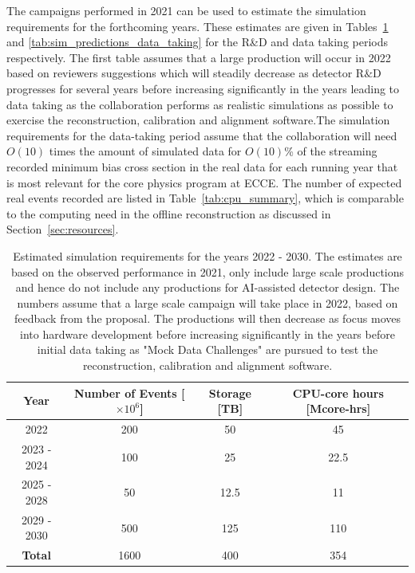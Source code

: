The campaigns performed in 2021 can be used to estimate the simulation requirements for the forthcoming years. These estimates are given in Tables~\ref{tab:sim_predictions} and \ref{tab:sim_predictions_data_taking} for the R\&D and data taking periods respectively. The first table assumes that a large production will occur in 2022 based on reviewers suggestions which will steadily decrease as detector R$\&$D progresses for several years before increasing significantly in the years leading to data taking as the collaboration performs as realistic simulations as possible to exercise the reconstruction, calibration and alignment software.The simulation requirements for the data-taking period assume that the collaboration will need $O(10)$ times the amount of simulated data for $O(10)$\% of the streaming recorded minimum bias cross section in the real data for each running year that is most relevant for the core physics program at ECCE. The number of expected real events recorded are listed in Table~\ref{tab:cpu_summary}, which is comparable to the computing need in the offline reconstruction as discussed in Section~\ref{sec:resources}.

\begin{table}[ht]
	\centering
	\begin{tabular}{c|c|c|c}
		\hline
		Year & Number of Events [$\times 10^{6}$] & Storage [TB] & CPU-core hours [Mcore-hrs] \\
		\hline
		\hline
		2022 & 200 & 50 & 45 \\
		2023 - 2024 & 100 & 25 & 22.5 \\
		2025 - 2028 & 50 & 12.5 & 11 \\
		2029 - 2030 & 500 & 125 & 110 \\
		\hline
		\hline
		\textbf{Total} & 1600 & 400 & 354 \\
		\hline
	\end{tabular}
	\caption[]{Estimated simulation requirements for the years 2022 - 2030. The estimates are based on the observed performance in 2021, only include large scale productions and hence do not include any productions for AI-assisted detector design. The numbers assume that a large scale campaign will take place in 2022, based on feedback from the proposal. The productions will then decrease as focus moves into hardware development before increasing significantly in the years before initial data taking as "Mock Data Challenges" are pursued to test the reconstruction, calibration and alignment software.}
	\label{tab:sim_predictions}
\end{table}

